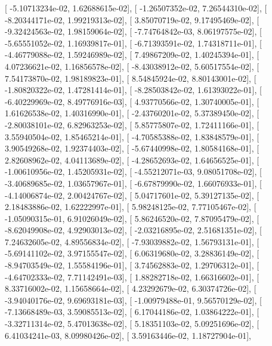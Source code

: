 \documentclass{article}
\begin{document}
       [ -5.10713234e-02,   1.62688615e-02],
       [ -1.26507352e-02,   7.26544310e-02],
       [ -8.20344171e-02,   1.99219313e-02],
       [  3.85070719e-02,   9.17495469e-02],
       [ -9.32424563e-02,   1.98159064e-02],
       [ -7.74764842e-03,   8.06197575e-02],
       [ -5.65551052e-02,   1.16939817e-01],
       [ -6.71393591e-02,   1.74318711e-01],
       [ -4.46779088e-02,   1.59246989e-02],
       [  7.49867209e-02,   1.40245394e-01],
       [  4.07236621e-02,   1.16856578e-02],
       [ -8.43038912e-02,   5.60517554e-02],
       [  7.54173870e-02,   1.98189823e-01],
       [  8.54845924e-02,   8.80143001e-02],
       [ -1.80820322e-02,   1.47281414e-01],
       [ -8.28503842e-02,   1.61393022e-01],
       [ -6.40229969e-02,   8.49776916e-03],
       [  4.93770566e-02,   1.30740005e-01],
       [  1.61626538e-02,   1.40316990e-01],
       [ -2.43760201e-02,   5.37389450e-02],
       [ -2.80038101e-02,   6.82963253e-02],
       [  5.85775807e-02,   1.72411166e-01],
       [  3.55940504e-02,   1.85465214e-01],
       [ -4.70585388e-02,   1.83848579e-01],
       [  3.90549268e-02,   1.92374403e-02],
       [ -5.67440998e-02,   1.80584168e-01],
       [  2.82608962e-02,   4.04113689e-02],
       [ -4.28652693e-02,   1.64656525e-01],
       [ -1.00610956e-02,   1.45205931e-02],
       [ -4.55212071e-03,   9.08051708e-02],
       [ -3.40689685e-02,   1.03657967e-01],
       [ -6.67879990e-02,   1.66076933e-01],
       [ -4.14006874e-02,   2.00424767e-02],
       [  5.04717601e-02,   5.39127135e-02],
       [  2.18483886e-02,   1.62222997e-01],
       [  5.98248125e-02,   7.77105467e-02],
       [ -1.05090315e-01,   6.91026049e-02],
       [  5.86246520e-02,   7.87095479e-02],
       [ -8.62049908e-02,   4.92903013e-02],
       [ -2.03216895e-02,   2.51681351e-02],
       [  7.24632605e-02,   4.89556834e-02],
       [ -7.93039882e-02,   1.56793131e-01],
       [ -5.69141102e-02,   3.97155547e-02],
       [  6.06319680e-02,   3.28836149e-02],
       [ -8.94703549e-02,   1.55584196e-01],
       [  3.74562883e-02,   1.29706312e-01],
       [ -4.64702333e-02,   7.71142491e-03],
       [  1.88282718e-02,   1.66316602e-01],
       [  8.33716002e-02,   1.15658664e-02],
       [  4.23292679e-02,   6.30374726e-02],
       [ -3.94040176e-02,   9.69693181e-03],
       [ -1.00979488e-01,   9.56570129e-02],
       [ -7.13668489e-03,   3.59085513e-02],
       [  6.17044186e-02,   1.03864222e-01],
       [ -3.32711314e-02,   5.47013638e-02],
       [  5.18351103e-02,   5.09251696e-02],
       [  6.41034241e-03,   8.09980426e-02],
       [  3.59163446e-02,   1.18727904e-01],
\end{document}
